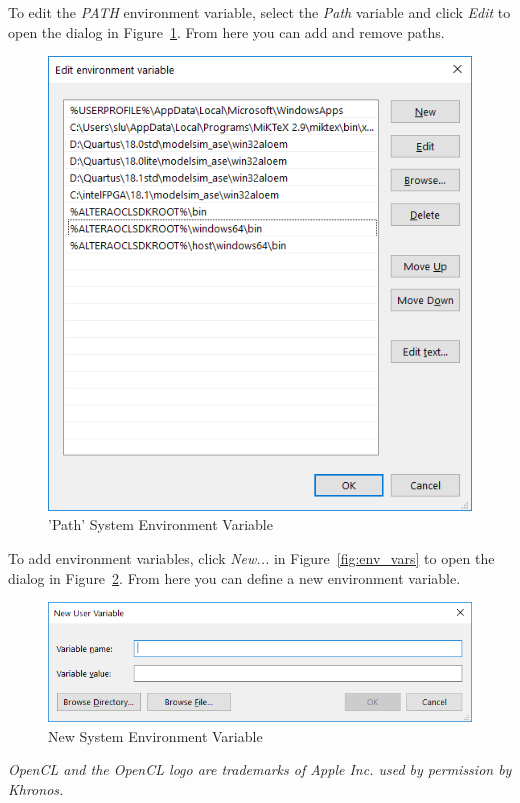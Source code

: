 \documentclass[11pt, twoside, pdftex]{article}
\newcommand{\commonPath}{../../Common}
\begin{document}
To edit the \textit{PATH} environment variable, select the \textit{Path} variable and click \textit{Edit} to open the dialog in Figure~\ref{fig:path_system_var}. From here you can add and remove paths.
	\begin{figure} [H]
	\begin{center}
	\includegraphics[scale = 0.5]{figures/fig_path_var.PNG}
	\end{center}
	\caption{'Path' System Environment Variable}
	\label{fig:path_system_var}
	\end{figure}

To add environment variables, click \textit{New...} in Figure~\ref{fig:env_vars} to open the dialog in Figure~\ref{fig:new_system_var}. From here you can define a new environment variable.
	\begin{figure} [H]
	\begin{center}
	\includegraphics[scale = 0.7]{figures/fig_sys_settings_new_var.PNG}
	\end{center}
	\caption{New System Environment Variable}
	\label{fig:new_system_var}
	\end{figure}




{\it OpenCL and the OpenCL logo are trademarks of Apple Inc. used by permission by Khronos.}

\end{document}
